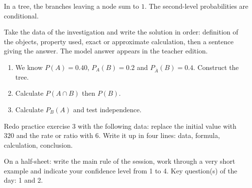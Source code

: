     \begin{traceecrite}In a tree, the branches leaving a node sum to $1$. The second-level probabilities are conditional.\end{traceecrite}

    \begin{exemple}
    Take the data of the investigation and write the solution in order: definition of the objects, property used, exact or approximate calculation, then a sentence giving the answer. The model answer appears in the teacher edition.
    \end{exemple}

    \begin{exercice}[-- essential]
    \begin{enumerate}\item We know $P(A)=0.40$, $P_A(B)=0.2$ and $P_{\overline A}(B)=0.4$. Construct the tree.\item Calculate $P(A\cap B)$ then $P(B)$.\item Calculate $P_B(A)$ and test independence.\end{enumerate}
    \end{exercice}


    \begin{dm}Redo practice exercise 3 with the following data: replace the initial value with $320$ and the rate or ratio with $6$. Write it up in four lines: data, formula, calculation, conclusion.\end{dm}

    \begin{sortie}On a half-sheet: write the main rule of the session, work through a very short example and indicate your confidence level from 1 to 4. Key question(s) of the day: 1 and 2.\end{sortie}


